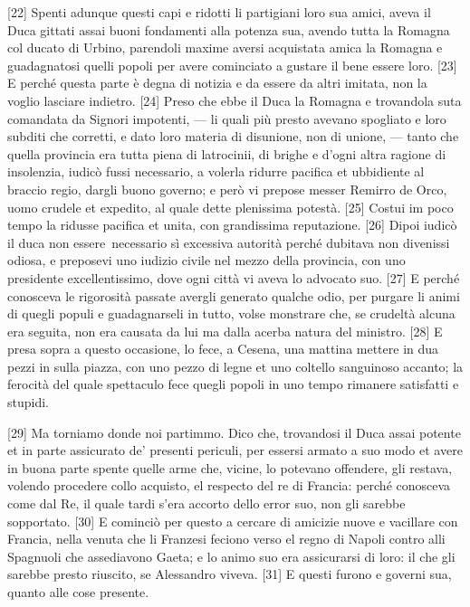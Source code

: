 {[}22{]} Spenti adunque questi capi e ridotti li partigiani loro sua
amici, aveva il Duca gittati assai buoni fondamenti alla potenza sua,
avendo tutta la Romagna col ducato di Urbino, parendoli maxime aversi
acquistata amica la Romagna e guadagnatosi quelli popoli per avere
cominciato a gustare il bene essere loro. {[}23{]} E perché questa parte
è degna di notizia e da essere da altri imitata, non la voglio lasciare
indietro. {[}24{]} Preso che ebbe il Duca la Romagna e trovandola suta
comandata da Signori impotenti, --- li quali più presto avevano spogliato
e loro subditi che corretti, e dato loro materia di disunione, non di
unione, --- tanto che quella provincia era tutta piena di latrocinii, di
brighe e d'ogni altra ragione di insolenzia, iudicò fussi necessario, a
volerla ridurre pacifica et ubbidiente al braccio regio, dargli buono
governo; e però vi prepose messer Remirro de Orco, uomo crudele et
expedito, al quale dette plenissima potestà. {[}25{]} Costui im poco
tempo la ridusse pacifica et unita, con grandissima reputazione.
{[}26{]} Dipoi iudicò il duca non essere\est\ necessario sì excessiva
autorità perché dubitava non divenissi odiosa, e preposevi uno iudizio
civile nel mezzo della provincia, con uno presidente excellentissimo,
dove ogni città vi aveva lo advocato suo. {[}27{]} E perché conosceva le
rigorosità passate avergli generato qualche odio, per purgare li animi
di quegli populi e guadagnarseli in tutto, volse monstrare che, se
crudeltà alcuna era seguita, non era causata da lui ma dalla acerba
natura del ministro. {[}28{]} E presa sopra a questo occasione, lo fece,
a Cesena, una mattina mettere in dua pezzi in sulla piazza, con uno
pezzo di legne et uno coltello sanguinoso accanto; la ferocità del quale
spettaculo fece quegli popoli in uno tempo rimanere satisfatti e
stupidi.

{[}29{]} Ma torniamo donde noi partimmo. Dico che, trovandosi il Duca
assai potente et in parte assicurato de' presenti periculi, per essersi
armato a suo modo et avere in buona parte spente quelle arme che,
vicine, lo potevano offendere, gli restava, volendo procedere collo
acquisto, el respecto del re di Francia: perché conosceva come dal Re,
il quale tardi s'era accorto dello error suo, non gli sarebbe
sopportato. {[}30{]} E cominciò per questo a cercare di amicizie nuove e
vacillare con Francia, nella venuta che li Franzesi feciono verso el
regno di Napoli contro alli Spagnuoli che assediavono Gaeta; e lo animo
suo era assicurarsi di loro: il che gli sarebbe presto riuscito, se
Alessandro viveva. {[}31{]} E questi furono e governi sua, quanto alle
cose presente.

